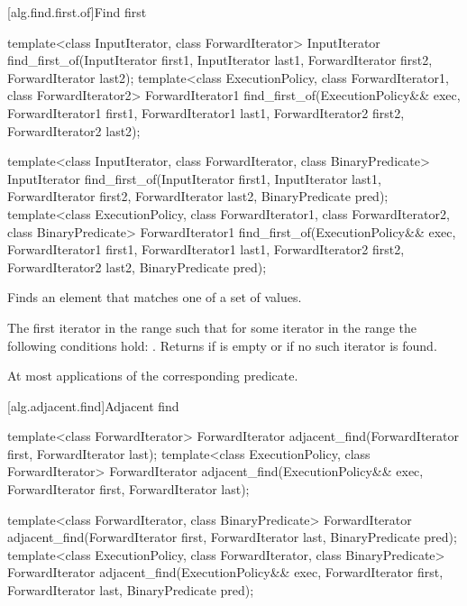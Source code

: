 [alg.find.first.of]{Find first}

%
\begin{itemdecl}
template<class InputIterator, class ForwardIterator>
  InputIterator
    find_first_of(InputIterator first1, InputIterator last1,
                  ForwardIterator first2, ForwardIterator last2);
template<class ExecutionPolicy, class ForwardIterator1, class ForwardIterator2>
  ForwardIterator1
    find_first_of(ExecutionPolicy&& exec,
                  ForwardIterator1 first1, ForwardIterator1 last1,
                  ForwardIterator2 first2, ForwardIterator2 last2);

template<class InputIterator, class ForwardIterator,
          class BinaryPredicate>
  InputIterator
    find_first_of(InputIterator first1, InputIterator last1,
                  ForwardIterator first2, ForwardIterator last2,
                  BinaryPredicate pred);
template<class ExecutionPolicy, class ForwardIterator1, class ForwardIterator2,
         class BinaryPredicate>
  ForwardIterator1
    find_first_of(ExecutionPolicy&& exec,
                  ForwardIterator1 first1, ForwardIterator1 last1,
                  ForwardIterator2 first2, ForwardIterator2 last2,
                  BinaryPredicate pred);
\end{itemdecl}

\begin{itemdescr}
\pnum
\effects
Finds an element that matches one of a set of values.

\pnum
\returns
The first iterator
in the range 
such that for some
iterator
in the range 
the following conditions hold:
.
Returns 
if  is empty or
if no such iterator is found.

\pnum
\complexity
At most
applications of the corresponding predicate.
\end{itemdescr}

[alg.adjacent.find]{Adjacent find}

%
\begin{itemdecl}
template<class ForwardIterator>
  ForwardIterator adjacent_find(ForwardIterator first, ForwardIterator last);
template<class ExecutionPolicy, class ForwardIterator>
  ForwardIterator adjacent_find(ExecutionPolicy&& exec,
                                ForwardIterator first, ForwardIterator last);

template<class ForwardIterator, class BinaryPredicate>
  ForwardIterator adjacent_find(ForwardIterator first, ForwardIterator last,
                                BinaryPredicate pred);
template<class ExecutionPolicy, class ForwardIterator, class BinaryPredicate>
  ForwardIterator adjacent_find(ExecutionPolicy&& exec,
                                ForwardIterator first, ForwardIterator last,
                                BinaryPredicate pred);
\end{itemdecl}

